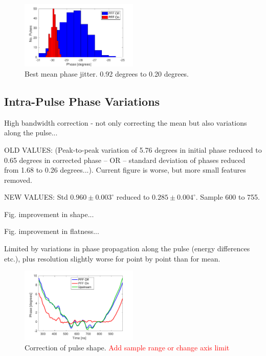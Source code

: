 \documentclass[%
 reprint,
 amsmath,amssymb,
 aps,
]{revtex4-1}
\begin{document}
\begin{figure}
\includegraphics[width=0.5\textwidth]{figs/meanJit}%
\caption{\label{fig:meanJit}Best mean phase jitter. 0.92 degrees to 0.20 
degrees.}
\end{figure}


\subsection{\label{ss:shape}Intra-Pulse Phase Variations}

High bandwidth correction - not only correcting the mean but also variations 
along the pulse...

OLD VALUES: (Peak-to-peak variation of 5.76 degrees in initial phase reduced to 
0.65 degrees in corrected phase -- OR -- standard deviation of phases reduced 
from 1.68 to 0.26 degrees...). Current figure is worse, but more small features 
removed.

NEW VALUES: Std \(0.960\pm0.003^\circ\) reduced to \(0.285\pm0.004^\circ\). 
Sample 600 to 755.

Fig. improvement in shape...

Fig. improvement in flatness...

Limited by variations in phase propagation along the pulse (energy differences 
etc.), plus resolution slightly worse for point by point than for mean.


\begin{figure}
\includegraphics[width=0.5\textwidth]{figs/shape}%
\caption{\label{fig:shape}Correction of pulse shape. \textcolor{red}{Add sample 
range or change axis limit}}
\end{figure}
\end{document}
